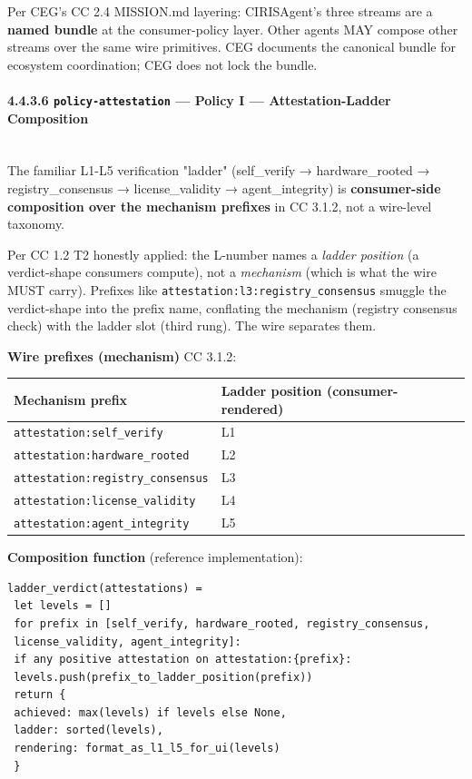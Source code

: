 \documentclass[11pt]{article}
\begin{document}
Per CEG's CC 2.4 MISSION.md layering: CIRISAgent's three streams are a \textbf{named bundle} at the consumer-policy layer. Other agents MAY compose other streams over the same wire primitives. CEG documents the canonical bundle for ecosystem coordination; CEG does not lock the bundle.


\paragraph{4.4.3.6 \texttt{policy-attestation} — Policy I — Attestation-Ladder Composition}\mbox{}\\


The familiar L1-L5 verification "ladder" (self\_verify → hardware\_rooted → registry\_consensus → license\_validity → agent\_integrity) is \textbf{consumer-side composition over the mechanism prefixes} in CC 3.1.2, not a wire-level taxonomy.


Per CC 1.2 T2 honestly applied: the L-number names a \textit{ladder position} (a verdict-shape consumers compute), not a \textit{mechanism} (which is what the wire MUST carry). Prefixes like \texttt{attestation:l3:registry\_consensus} smuggle the verdict-shape into the prefix name, conflating the mechanism (registry consensus check) with the ladder slot (third rung). The wire separates them.


\textbf{Wire prefixes (mechanism)} CC 3.1.2:


{\footnotesize
\begin{longtable}{|p{8.0cm}|p{8.0cm}|}\hline
\textbf{Mechanism prefix} & \textbf{Ladder position (consumer-rendered)} \\ \hline\endhead
\texttt{attestation:self\_verify} & L1 \\ \hline
\texttt{attestation:hardware\_rooted} & L2 \\ \hline
\texttt{attestation:registry\_consensus} & L3 \\ \hline
\texttt{attestation:license\_validity} & L4 \\ \hline
\texttt{attestation:agent\_integrity} & L5 \\ \hline
\end{longtable}}


\textbf{Composition function} (reference implementation):


\begin{lstlisting}
ladder_verdict(attestations) =
 let levels = []
 for prefix in [self_verify, hardware_rooted, registry_consensus,
 license_validity, agent_integrity]:
 if any positive attestation on attestation:{prefix}:
 levels.push(prefix_to_ladder_position(prefix))
 return {
 achieved: max(levels) if levels else None,
 ladder: sorted(levels),
 rendering: format_as_l1_l5_for_ui(levels)
 }
\end{lstlisting}
\end{document}
